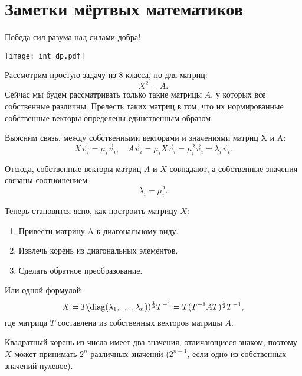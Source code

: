 \section{Заметки мёртвых математиков} %
\begin{epigraph}
    Победа сил разума над силами добра!
\end{epigraph}
\begin{center}
      \texttt{[image: int\_dp.pdf]}
\end{center}

Рассмотрим простую задачу из 8 класса, но для матриц:
\begin{equation}
    X^2 = A.
\end{equation}
Сейчас мы будем рассматривать только такие матрицы \( A \), у которых все собственные различны. Прелесть таких матриц в том, что их нормированные собственные векторы определены единственным образом.

Выясним связь, между собственными векторами и значениями матриц X и A:
\begin{equation}
    X\vec{v}_i = \mu_i\vec{v}_i,\quad
    A\vec{v}_i = \mu_i X \vec{v}_i = \mu_i^2 \vec{v}_i = \lambda_i \vec{v}_i.
\end{equation}

Отсюда, собственные векторы матриц \( A \) и \( X \) совпадают, а собственные значения связаны соотношением
\begin{equation}
    \lambda_i = \mu_i^2.
\end{equation}

Теперь становится ясно, как построить матрицу \( X \):
\begin{enumerate}
    \item Привести матрицу A к диагональному виду.
    \item Извлечь корень из диагональных элементов.
    \item Сделать обратное преобразование.
\end{enumerate}

Или одной формулой
\begin{equation}
    X = T(\operatorname{diag}(\lambda_1,\ldots,\lambda_n))^\frac{1}{2}T^{-1}=T(T^{-1}AT)^\frac{1}{2}T^{-1},
\end{equation}
где матрица \( T \) составлена из собственных векторов матрицы \( A \).

Квадратный корень из числа имеет два значения, отличающиеся знаком, поэтому \( X \) может принимать \( 2^n \) различных значений (\( 2^{n-1} \), если одно из собственных значений нулевое).

